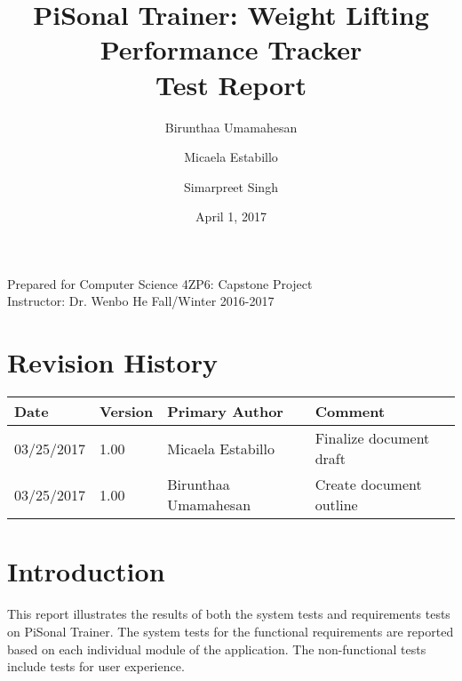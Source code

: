 \documentclass{article}
\title{
PiSonal Trainer: Weight Lifting Performance Tracker\\
\Large {Test Report}
}
\date{April 1, 2017}
\author{Birunthaa Umamahesan \and Micaela Estabillo \and Simarpreet Singh}
\begin{document}
\thispagestyle{plain}
\maketitle
\vfill
\begin{center}
    Prepared for Computer Science 4ZP6: Capstone Project \\
    Instructor: Dr. Wenbo He
    Fall/Winter 2016-2017\\
\end{center}
\newpage

\tableofcontents

\listoffigures

\listoftables

\thispagestyle{plain}

\section*{Revision History}
\begingroup
\begin{tabular}{ | p{2cm} | p{1.5cm} | p{3.8cm} | p{7cm} |} 
    \hline
    \textbf{Date} & \textbf{Version} & \textbf{Primary Author} & \textbf{Comment}\\
    \hline
    03/25/2017 & 1.00 & Micaela Estabillo & Finalize document draft\\
    \hline
    03/25/2017 & 1.00 & Birunthaa Umamahesan & Create document outline\\
    \hline
\end{tabular}
\endgroup


\begin{center}
\end{center}

\newpage

\clearpage
\setcounter{page}{1}

% 

\section{Introduction}
This report illustrates the results of both the system tests and requirements tests on PiSonal Trainer. The system tests for the functional requirements are reported based on each individual module of the application. The non-functional tests include tests for user experience.
\end{document}

